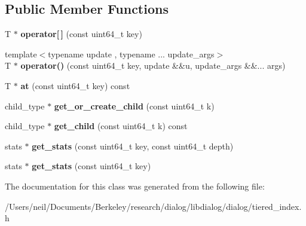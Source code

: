\subsection*{Public Member Functions}
\begin{DoxyCompactItemize}
\item 
\mbox{\label{classdialog_1_1index_1_1tiered__index_3_01_t_00_01_k_00_011_00_01stats_01_4_a575da4528e82b491f809ea3a63b4e472}} 
T $\ast$ {\bfseries operator\mbox{[}$\,$\mbox{]}} (const uint64\+\_\+t key)
\item 
\mbox{\label{classdialog_1_1index_1_1tiered__index_3_01_t_00_01_k_00_011_00_01stats_01_4_a5ff6245b3e64164336240d226c6c5b60}} 
{\footnotesize template$<$typename update , typename ... update\+\_\+args$>$ }\\T $\ast$ {\bfseries operator()} (const uint64\+\_\+t key, update \&\&u, update\+\_\+args \&\&... args)
\item 
\mbox{\label{classdialog_1_1index_1_1tiered__index_3_01_t_00_01_k_00_011_00_01stats_01_4_a8ee212cbd6e2e566b1dae4ba6baf7f19}} 
T $\ast$ {\bfseries at} (const uint64\+\_\+t key) const
\item 
\mbox{\label{classdialog_1_1index_1_1tiered__index_3_01_t_00_01_k_00_011_00_01stats_01_4_a257e903a3b97376075dad8a7339c478a}} 
child\+\_\+type $\ast$ {\bfseries get\+\_\+or\+\_\+create\+\_\+child} (const uint64\+\_\+t k)
\item 
\mbox{\label{classdialog_1_1index_1_1tiered__index_3_01_t_00_01_k_00_011_00_01stats_01_4_a4050e025ebfdab1f4fdff7d37945fd62}} 
child\+\_\+type $\ast$ {\bfseries get\+\_\+child} (const uint64\+\_\+t k) const
\item 
\mbox{\label{classdialog_1_1index_1_1tiered__index_3_01_t_00_01_k_00_011_00_01stats_01_4_af8fcd703463423d5536121eba5125f13}} 
stats $\ast$ {\bfseries get\+\_\+stats} (const uint64\+\_\+t key, const uint64\+\_\+t depth)
\item 
\mbox{\label{classdialog_1_1index_1_1tiered__index_3_01_t_00_01_k_00_011_00_01stats_01_4_aea12d5b19bfde3e9da8f51152e014e63}} 
stats $\ast$ {\bfseries get\+\_\+stats} (const uint64\+\_\+t key)
\end{DoxyCompactItemize}


The documentation for this class was generated from the following file\+:\begin{DoxyCompactItemize}
\item 
/\+Users/neil/\+Documents/\+Berkeley/research/dialog/libdialog/dialog/tiered\+\_\+index.\+h\end{DoxyCompactItemize}
